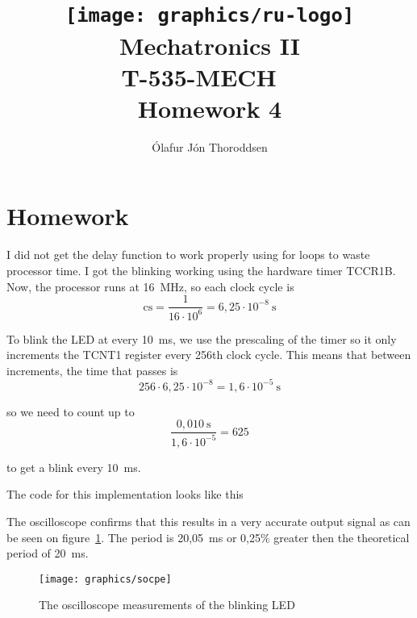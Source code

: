 \documentclass[11pt,a4paper,titlepage]{article}
\author{Ólafur Jón Thoroddsen}  %
\title{\texttt{[image: graphics/ru-logo]}\\\vspace{10mm}
	Mechatronics II\\T-535-MECH \ \\Homework 4}  %
\begin{document}
	\maketitle
	
\section{Homework}

I did not get the delay function to work properly using for loops to waste processor time. I got the blinking working using the hardware timer TCCR1B. Now, the processor runs at 16~MHz, so each clock cycle is $$\text{cs} = \frac{1}{16\cdot 10^{6}} = 6,25\cdot 10^{-8}~\text{s}$$

\noindent To blink the LED at every 10~ms, we use the prescaling of the timer so it only increments the TCNT1 register every 256th clock cycle. This means that between increments, the time that passes is $$256\cdot 6,25\cdot 10^{-8} = 1,6\cdot 10^{-5}~\text{s}$$

\noindent so we need to count up to $$\frac{0,010~\text{s}}{1,6\cdot 10^{-5}} = 625$$

\noindent to get a blink every 10~ms.

The code for this implementation looks like this



\noindent The oscilloscope confirms that this results in a very accurate output signal as can be seen on figure~\ref{fig:scope}. The period is 20,05~ms or 0,25\% greater then the theoretical period of 20~ms.

\begin{figure}[h]
	\centering
	\texttt{[image: graphics/socpe]}
	\caption{The oscilloscope measurements of the blinking LED}
	\label{fig:scope}
\end{figure}
\end{document}
